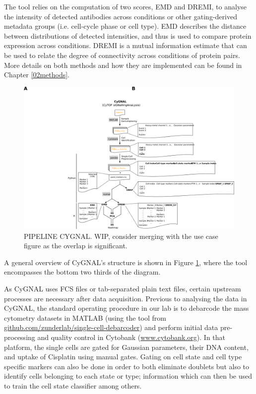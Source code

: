 The tool relies on the computation of two scores, EMD and DREMI, to analyse the intensity of detected antibodies across conditions or other gating-derived metadata groups (i.e. cell-cycle phase or cell type). EMD describes the distance between distributions of detected intensities, and thus is used to compare protein expression across conditions. DREMI is a mutual information estimate that can be used to relate the degree of connectivity across conditions of protein pairs. More details on both methods and how they are implemented can be found in Chapter \ref{02methods}.

\begin{figure}
    \centering
    \includegraphics{03cytof/figs/3CYGNAL_pipeline.png}
    \caption{PIPELINE CYGNAL. WIP, consider merging with the use case figure as the overlap is significant.}
    \label{fig:3cygpipe}
\end{figure}

A general overview of CyGNAL's structure is shown in Figure \ref{fig:3cygpipe}, where the tool encompasses the bottom two thirds of the diagram.

As CyGNAL uses FCS files or tab-separated plain text files, certain upstream processes are necessary after data acquisition. Previous to analysing the data in CyGNAL, the standard operating procedure in our lab is to debarcode the mass cytometry datasets in MATLAB (using the tool from \href{github.com/zunderlab/single-cell-debarcoder}{github.com/zunderlab/single-cell-debarcoder}) and perform initial data pre-processing and quality control in Cytobank (\href{www.cytobank.org}{www.cytobank.org}). In that platform, the single cells are gated for Gaussian parameters, their DNA content, and uptake of Cisplatin using manual gates. Gating on cell state and cell type specific markers can also be done in order to both eliminate doublets but also to identify cells belonging to each state or type; information which can then be used to train the cell state classifier among others.

